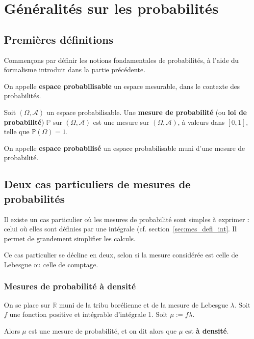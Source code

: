 \documentclass[../integ-proba.tex]{subfiles}
\begin{document}
    \chapter{Généralités sur les probabilités}

    \section{Premières définitions}

    Commençons par définir les notions fondamentales de probabilités, à l'aide du formalisme introduit dans la partie précédente.

    \begin{defi}
        On appelle \textbf{espace probabilisable} un espace mesurable, dans le contexte des probabilités.
    \end{defi}

    \begin{defi}
        Soit $\left(\Omega, \mathcal{A}\right)$ un espace probabilisable.
        Une \textbf{mesure de probabilité} (ou \textbf{loi de probabilité}) $\mathbb{P}$ sur $\left(\Omega, \mathcal{A}\right)$ est une mesure sur $\left(\Omega, \mathcal{A}\right)$, à valeurs dans $\left[0,1\right]$, telle que $\mathbb{P}\left(\Omega\right)=1$.
    \end{defi}

    \begin{defi}
        On appelle \textbf{espace probabilisé} un espace probabilisable muni d'une mesure de probabilité.
    \end{defi}

    \section{Deux cas particuliers de mesures de probabilités}

    Il existe un cas particulier où les mesures de probabilité sont simples à exprimer : celui où elles sont définies par une intégrale (cf. section~\ref{sec:mes_defi_int}.
    Il permet de grandement simplifier les calculs.

    Ce cas particulier se décline en deux, selon si la mesure considérée est celle de Lebesgue ou celle de comptage.

        \subsection{Mesures de probabilité à densité}
            \begin{defi}
                On se place sur $\mathbb{R}$ muni de la tribu borélienne et de la mesure de Lebesgue $\lambda$.
                Soit $f$ une fonction positive et intégrable d'intégrale 1.
                Soit $\mu:=f \lambda$.

                Alors $\mu$ est une mesure de probabilité, et on dit alors que $\mu$ est \textbf{à densité}.
            \end{defi}
\end{document}
